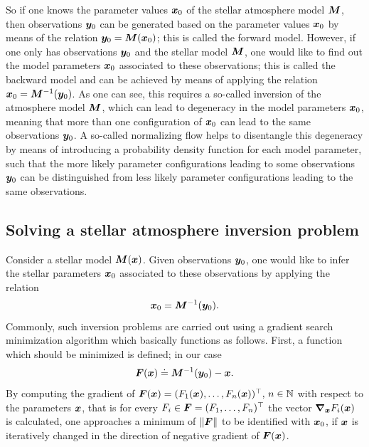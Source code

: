 \documentclass[a4paper,11pt]{report}
\def\lk#1{{\color{black}{#1}}}
\begin{document}
So if one knows the parameter values $\bm{x}_0$ of the stellar atmosphere model $\bm{M}$, then observations $\bm{y}_0$ can be generated based on the parameter values $\bm{x}_0$ by means of the relation $\bm{y}_0 = \bm{M}(\bm{x}_0)$; this is called the forward model. However, if one only has observations $\bm{y}_0$ and the stellar model $\bm{M}$, one would like to find out the model parameters $\bm{x}_0$ associated to these observations; this is called the backward model and can be achieved by means of applying the relation $\bm{x}_0 = \bm{M}^{-1}(\bm{y}_0)$. As one can see, this requires a so-called inversion of the atmosphere model $\bm{M}$, which can lead to degeneracy in the model parameters $\bm{x}_0$, meaning that more than one configuration of $\bm{x}_0$ can lead to the same observations $\bm{y}_0$. A so-called normalizing flow \lk{as it will be explained in the subsequent chapter} helps to disentangle this degeneracy by means of introducing a probability density function for each model parameter, such that the more likely parameter configurations leading to some observations $\bm{y}_0$ can be distinguished from less likely parameter configurations leading to the same observations.

\subsection{Solving a stellar atmosphere inversion problem}
Consider a stellar model $\bm{M}(\bm{x})$. Given observations $\bm{y}_0$, one would like to infer the stellar parameters $\bm{x}_0$ associated to these observations by applying the relation \begin{equation}
\bm{x}_0 = \bm{M}^{-1}(\bm{y}_0).
\end{equation} Commonly, such inversion problems are carried out using a gradient search minimization algorithm which basically functions as follows. First, a function which should be minimized is defined; in our case \begin{equation}
\bm{F}(\bm{x}) \doteq \bm{M}^{-1}(\bm{y}_0) - \bm{x}.
\end{equation} By computing the gradient of $\bm{F}(\bm{x}) = (F_1(\bm{x}), \dots, F_n(\bm{x}))^\top,\,n\in\mathbb{N}$ with respect to the parameters $\bm{x}$, that is for every $F_i \in \bm{F} = (F_1,\dots,F_n)^\top$ the vector $\bm{\nabla}_{\bm{x}}F_i(\bm{x})$ is calculated, one approaches a minimum of $\|\bm{F}\|$ to be identified with $\bm{x}_0$, if $\bm{x}$ is iteratively changed in the direction of negative gradient of $\bm{F}(\bm{x})$.
\end{document}
